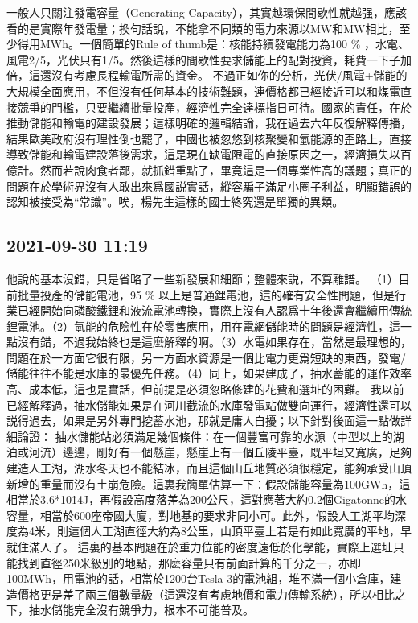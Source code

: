 \documentclass[twocolumn]{ctexart}
\begin{document}
一般人只關注發電容量（Generating Capacity），其實越環保間歇性就越强，應該看的是實際年發電量；換句話說，不能拿不同類的電力來源以MW和MW相比，至少得用MWh。一個簡單的Rule of thumb是：核能持續發電能力為100 \% ，水電、風電2/5，光伏只有1/5。然後這樣的間歇性要求儲能上的配對投資，耗費一下子加倍，這還沒有考慮長程輸電所需的資金。
不過正如你的分析，光伏/風電+儲能的大規模全面應用，不但沒有任何基本的技術難題，連價格都已經接近可以和煤電直接競爭的門檻，只要繼續批量投產，經濟性完全達標指日可待。國家的責任，在於推動儲能和輸電的建設發展；這樣明確的邏輯結論，我在過去六年反復解釋傳播，結果歐美政府沒有理性倒也罷了，中國也被忽悠到核聚變和氫能源的歪路上，直接導致儲能和輸電建設落後需求，這是現在缺電限電的直接原因之一，經濟損失以百億計。然而若說肉食者鄙，就抓錯重點了，畢竟這是一個專業性高的議題；真正的問題在於學術界沒有人敢出來爲國説實話，縱容騙子滿足小圈子利益，明顯錯誤的認知被接受為“常識”。唉，楊先生這樣的國士終究還是單獨的異類。
\subsection*{2021-09-30 11:19}

他說的基本沒錯，只是省略了一些新發展和細節；整體來説，不算離譜。
（1）目前批量投產的儲能電池，95 \% 以上是普通鋰電池，這的確有安全性問題，但是行業已經開始向磷酸鐵鋰和液流電池轉換，實際上沒有人認爲十年後還會繼續用傳統鋰電池。（2）氫能的危險性在於零售應用，用在電網儲能時的問題是經濟性，這一點沒有錯，不過我始終也是這麽解釋的啊。（3）水電如果存在，當然是最理想的，問題在於一方面它很有限，另一方面水資源是一個比電力更爲短缺的東西，發電/儲能往往不能是水庫的最優先任務。（4）同上，如果建成了，抽水蓄能的運作效率高、成本低，這也是實話，但前提是必須忽略修建的花費和選址的困難。
我以前已經解釋過，抽水儲能如果是在河川截流的水庫發電站做雙向運行，經濟性還可以説得過去，如果是另外專門挖蓄水池，那就是庸人自擾；以下針對後面這一點做詳細論證：
抽水儲能站必須滿足幾個條件：在一個豐富可靠的水源（中型以上的湖泊或河流）邊邊，剛好有一個懸崖，懸崖上有一個丘陵平臺，既平坦又寬廣，足夠建造人工湖，湖水冬天也不能結冰，而且這個山丘地質必須很穩定，能夠承受山頂新增的重量而沒有土崩危險。這裏我簡單估算一下：假設儲能容量為100GWh，這相當於3.6*10\^14J，再假設高度落差為200公尺，這對應著大約0.2個Gigatonne的水容量，相當於600座帝國大廈，對地基的要求非同小可。此外，假設人工湖平均深度為4米，則這個人工湖直徑大約為8公里，山頂平臺上若是有如此寬廣的平地，早就住滿人了。
這裏的基本問題在於重力位能的密度遠低於化學能，實際上選址只能找到直徑250米級別的地點，那麽容量只有前面計算的千分之一，亦即100MWh，用電池的話，相當於1200台Tesla 3的電池組，堆不滿一個小倉庫，建造價格更是差了兩三個數量級（這還沒有考慮地價和電力傳輸系統），所以相比之下，抽水儲能完全沒有競爭力，根本不可能普及。
\end{document}
